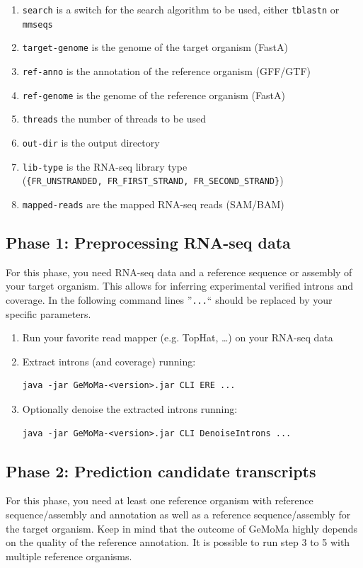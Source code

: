 \documentclass{article}
\begin{document}
\begin{enumerate}
	\item \texttt{search} is a switch for the search algorithm to be used, either \texttt{tblastn} or \texttt{mmseqs}
	\item \texttt{target-genome} is the genome of the target organism (FastA)
	\item \texttt{ref-anno} is the annotation of the reference organism (GFF/GTF)
	\item \texttt{ref-genome} is the genome of the reference organism (FastA)
	\item \texttt{threads} the number of threads to be used
	\item \texttt{out-dir} is the output directory
	\item \texttt{lib-type} is the RNA-seq library type\\
		(\verb"{FR_UNSTRANDED, FR_FIRST_STRAND, FR_SECOND_STRAND}")
	\item \texttt{mapped-reads} are the mapped RNA-seq reads (SAM/BAM)
\end{enumerate}

\clearpage

\subsection{Phase 1: Preprocessing RNA-seq data}
For this phase, you need RNA-seq data and a reference sequence or assembly of your target organism.
This allows for inferring experimental verified introns and coverage. In the following command lines ''\verb"..."`` should be replaced by your specific parameters.

\begin{enumerate}
\item	Run your favorite read mapper (e.g. TopHat, \ldots) on your RNA-seq data
\item	Extract introns (and coverage) running: 
\begin{verbatim}
java -jar GeMoMa-<version>.jar CLI ERE ...
\end{verbatim}
\item	Optionally denoise the extracted introns running: 
\begin{verbatim}
java -jar GeMoMa-<version>.jar CLI DenoiseIntrons ...
\end{verbatim}
\end{enumerate}

\subsection{Phase 2: Prediction candidate transcripts}
For this phase, you need at least one reference organism with reference sequence/assembly and annotation as well as a reference sequence/assembly for the target organism.
Keep in mind that the outcome of GeMoMa highly depends on the quality of the reference annotation.
It is possible to run step 3 to 5 with multiple reference organisms.
\end{document}
